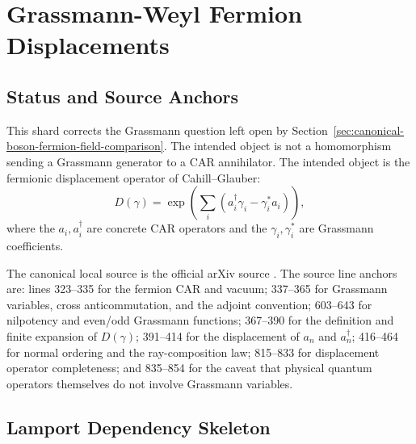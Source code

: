 
\section{Grassmann-Weyl Fermion Displacements}
\label{sec:grassmann-weyl-fermion-displacements}

\subsection{Status and Source Anchors}

This shard corrects the Grassmann question left open by
Section~\ref{sec:canonical-boson-fermion-field-comparison}.  The intended
object is not a homomorphism sending a Grassmann generator to a CAR
annihilator.  The intended object is the fermionic displacement operator of
Cahill--Glauber:
\[
  D(\gamma)=
  \exp\!\left(\sum_i(a_i^\dagger\gamma_i-\gamma_i^*a_i)\right),
\]
where the \(a_i,a_i^\dagger\) are concrete CAR operators and the
\(\gamma_i,\gamma_i^*\) are Grassmann coefficients.

The canonical local source is the official arXiv source
.
The source line anchors are: lines 323--335 for the fermion CAR and vacuum;
337--365 for Grassmann variables, cross anticommutation, and the adjoint
convention; 603--643 for nilpotency and even/odd Grassmann functions;
367--390 for the definition and finite expansion of \(D(\gamma)\); 391--414
for the displacement of \(a_n\) and \(a_n^\dagger\); 416--464 for normal
ordering and the ray-composition law; 815--833 for displacement operator
completeness; and 835--854 for the caveat that physical quantum operators
themselves do not involve Grassmann variables.

\subsection{Lamport Dependency Skeleton}

